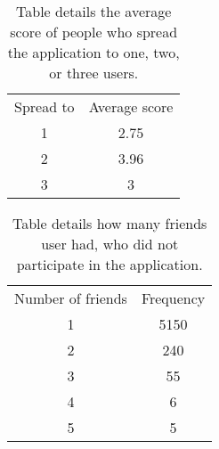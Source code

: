 \documentclass[preprint,12pt]{elsarticle}
\begin{document}
\begin{table}
\label{tab:scorespread}
\begin{tabular}{c c}
Spread to & Average score \\
1&	2.75 \\
2&	3.96 \\
3&	3 \\
\end{tabular}
\caption{Table details the average score of people who spread the
  application to one, two, or three users.}
\end{table}

\begin{table}
\label{tab:nouser}
\begin{tabular}{c c}
Number of friends & Frequency \\
1& 5150\\
2& 240\\
3& 55\\
4& 6\\
5& 5\\
\end{tabular}
\caption{Table details how many friends user had, who did not
  participate in the application.}
\end{table}
\end{document}

